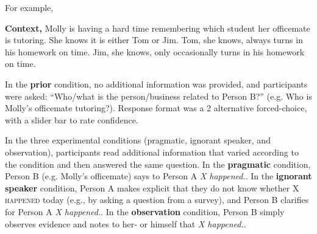 \documentclass[10pt,letterpaper]{article}
\begin{document}
For example,

\textbf{Context,} Molly is having a hard time remembering which student her officemate is tutoring.  
She knows it is either Tom or Jim. 
Tom, she knows, always turns in his homework on time.  
Jim, she knows, only occasionally turns in his homework on time.

In the \textbf{prior} condition, no additional information was provided, and participants were asked: ``Who/what is the person/business related to Person B?'' (e.g. Who is Molly's officemate tutoring?).  Response format was a 2 alternative forced-choice, with a slider bar to rate confidence.

In the three experimental conditions (pragmatic, ignorant speaker, and observation), participants read additional information that varied according to the condition and then answered the same question.
In the \textbf{pragmatic} condition,  Person B (e.g. Molly's officemate) says to Person A \emph{X happened.}. 
In the \textbf{ignorant speaker} condition, Person A makes explicit that they do not know whether \textsc{X happened} today (e.g., by asking a question from a survey), and Person B clarifies for Person A \emph{X happened.}.
In the \textbf{observation} condition, Person B simply observes evidence and notes to her- or himself that \emph{X happened.}.
\end{document}
